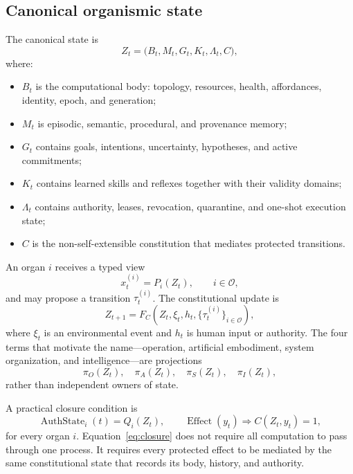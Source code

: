\documentclass[journal,10pt]{IEEEtran}
\begin{document}
\subsection{Canonical organismic state}
The canonical state is
\begin{equation}
  Z_t = \bigl(B_t,M_t,G_t,K_t,\Lambda_t,C\bigr), \label{eq:state}
\end{equation}
where:
\begin{itemize}
  \item $B_t$ is the computational body: topology, resources, health, affordances, identity, epoch, and generation;
  \item $M_t$ is episodic, semantic, procedural, and provenance memory;
  \item $G_t$ contains goals, intentions, uncertainty, hypotheses, and active commitments;
  \item $K_t$ contains learned skills and reflexes together with their validity domains;
  \item $\Lambda_t$ contains authority, leases, revocation, quarantine, and one-shot execution state;
  \item $C$ is the non-self-extensible constitution that mediates protected transitions.
\end{itemize}

An organ $i$ receives a typed view
\begin{equation}
  x_t^{(i)} = P_i(Z_t), \qquad i\in\mathcal O, \label{eq:organprojection}
\end{equation}
and may propose a transition $\tau_t^{(i)}$. The constitutional update is
\begin{equation}
  Z_{t+1}=F_C\!\left(Z_t,\xi_t,h_t,\{\tau_t^{(i)}\}_{i\in\mathcal O}\right), \label{eq:transition}
\end{equation}
where $\xi_t$ is an environmental event and $h_t$ is human input or authority. The four terms that motivate the name---operation, artificial embodiment, system organization, and intelligence---are projections
\begin{equation}
  \pi_O(Z_t),\quad \pi_A(Z_t),\quad \pi_S(Z_t),\quad \pi_I(Z_t), \label{eq:projections}
\end{equation}
rather than independent owners of state.

A practical closure condition is
\begin{equation}
  \operatorname{AuthState}_i(t)=Q_i(Z_t), \qquad
  \operatorname{Effect}(y_t)\Rightarrow C(Z_t,y_t)=1, \label{eq:closure}
\end{equation}
for every organ $i$. Equation~\eqref{eq:closure} does not require all computation to pass through one process. It requires every protected effect to be mediated by the same constitutional state that records its body, history, and authority.
\end{document}
